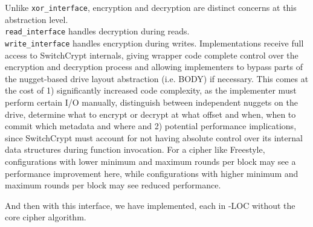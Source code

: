  Unlike
\texttt{xor\_interface}, encryption and decryption are distinct concerns
at this abstraction level. \\\texttt{read\_interface} handles decryption
during reads. \\\texttt{write\_interface} handles encryption during
writes. Implementations receive full access to SwitchCrypt internals,
giving wrapper code complete control over the encryption and decryption
process and allowing implementers to bypass parts of the nugget-based
drive layout abstraction (i.e. BODY) if necessary. This comes at the cost
of 1) significantly increased code complexity, as the implementer must
perform certain I/O manually, distinguish between independent nuggets on
the drive, determine what to encrypt or decrypt at what offset and when,
when to commit which metadata and where and 2) potential performance
implications, since SwitchCrypt must account for not having absolute
control over its internal data structures during function invocation. For
a cipher like Freestyle, configurations with lower minimum and maximum
rounds per block may see a performance improvement here, while
configurations with higher minimum and maximum rounds per block may see
reduced performance.

And then with this interface, we have implemented, 
each in \xxx-\xxx LOC without the core cipher algorithm.




